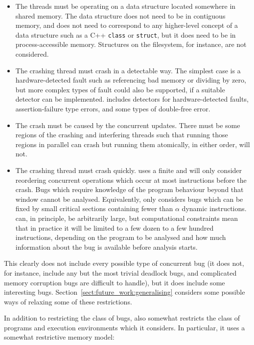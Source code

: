 \begin{itemize}
\item The threads must be operating on a data structure located
  somewhere in shared memory.  The data structure does not need to be
  in contiguous memory, and does not need to correspond to any
  higher-level concept of a data structure such as a C++
  \texttt{class} or \texttt{struct}, but it does need to be in
  process-accessible memory.  Structures on the filesystem, for
  instance, are not considered.
\item The crashing thread must crash in a detectable way.  The
  simplest case is a hardware-detected fault such as referencing bad
  memory or dividing by zero, but more complex types of fault could
  also be supported, if a suitable detector can be implemented.
  {\Implementation} includes detectors for hardware-detected faults,
  assertion-failure type errors, and some types of double-free error.
\item The crash must be caused by the concurrent updates.  There must
  be some regions of the crashing and interfering threads such that
  running those regions in parallel can crash but running them
  atomically, in either order, will not.
\item The crashing thread must crash quickly.  {\Technique} uses a
  finite  \introduction{$\alpha$} and
  will only consider reordering concurrent operations which occur at
  most \backref{$\alpha$} instructions before the crash.  Bugs which
  require knowledge of the program behaviour beyond that window cannot
  be analysed.  Equivalently, {\technique} only considers bugs which
  can be fixed by small critical sections containing fewer than
  $\alpha$ dynamic instructions.  \backref{$\alpha$} can, in
  principle, be arbitrarily large, but computational constraints mean
  that in practice it will be limited to a few dozen to a few hundred
  instructions, depending on the program to be analysed and how much
  information about the bug is available before analysis starts.
\end{itemize}

This clearly does not include every possible type of concurrent bug
(it does not, for instance, include any but the most trivial deadlock
bugs, and complicated memory corruption bugs are difficult to handle),
but it does include some interesting bugs.
Section~\ref{sect:future_work:generalising} considers some possible
ways of relaxing some of these restrictions.

In addition to restricting the class of bugs, {\technique} also
somewhat restricts the class of programs and execution environments
which it considers.  In particular, it uses a somewhat restrictive
memory model:

